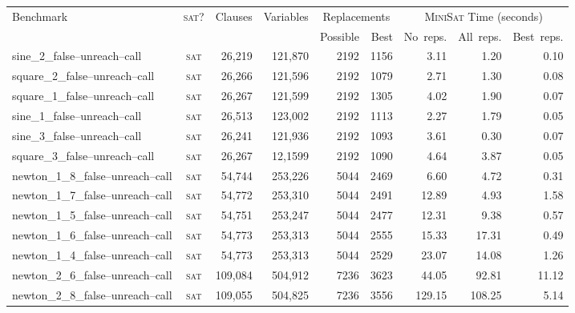 \documentclass[proof,pdftex,11pt,a4,titlepage]{article}
\newcommand{\sat}{\textsc{sat}}
\begin{document}
\begin{table}
  \begin{minipage}{\textwidth+3cm}
    \begin{tabular}{|l|crr|rr|rrr|}
      \hline
      \multirow{2}{*}{Benchmark} & \multirow{2}{*}{\sat{}?} & \multirow{2}{*}{Clauses} & \multirow{2}{*}{Variables} & \multicolumn{2}{c|}{Replacements} & \multicolumn{3}{c|}{\textsc{MiniSat} Time (seconds)} \\
       &  &  &  & \mbox{Possible} & \mbox{Best} & \mbox{No reps.} & \mbox{All reps.} & \mbox{Best reps.} \\
      \hline
      sine\_2\_false--unreach--call & \sat{} & 26,219 & 121,870 & 2192 & 1156 & 3.11 & 1.20 & 0.10\\
      square\_2\_false--unreach--call & \sat{} & 26,266 & 121,596 &  2192 & 1079 & 2.71 & 1.30 & 0.08 \\
      square\_1\_false--unreach--call & \sat{} & 26,267 & 121,599 & 2192 & 1305 & 4.02 & 1.90 & 0.07 \\
      sine\_1\_false--unreach--call & \sat{} & 26,513 & 123,002 & 2192 & 1113 & 2.27 & 1.79 & 0.05 \\
      sine\_3\_false--unreach--call & \sat{} & 26,241 & 121,936 & 2192 & 1093 & 3.61 & 0.30 & 0.07  \\
      square\_3\_false--unreach--call & \sat{} & 26,267 & 12,1599 & 2192 & 1090 & 4.64 & 3.87 & 0.05 \\
      newton\_1\_8\_false--unreach--call & \sat{} & 54,744 & 253,226 & 5044 & 2469 & 6.60 & 4.72 & 0.31 \\
      newton\_1\_7\_false--unreach--call & \sat{} & 54,772 & 253,310 &  5044 & 2491 & 12.89 & 4.93 & 1.58  \\
      newton\_1\_5\_false--unreach--call & \sat{} & 54,751 & 253,247 &  5044 & 2477 & 12.31 & 9.38 & 0.57  \\
      newton\_1\_6\_false--unreach--call & \sat{} & 54,773 & 253,313 &  5044 & 2555 & 15.33 & 17.31 & 0.49  \\
      newton\_1\_4\_false--unreach--call & \sat{} & 54,773 & 253,313 &  5044 & 2529 & 23.07 & 14.08 & 1.26  \\
      newton\_2\_6\_false--unreach--call & \sat{} & 109,084 & 504,912 &  7236 & 3623 & 44.05 & 92.81 & 11.12  \\
      newton\_2\_8\_false--unreach--call & \sat{} & 109,055 & 504,825 &  7236 & 3556 & 129.15 & 108.25 & 5.14 \\

\end{tabular}
\end{minipage}
\end{table}
\end{document}
